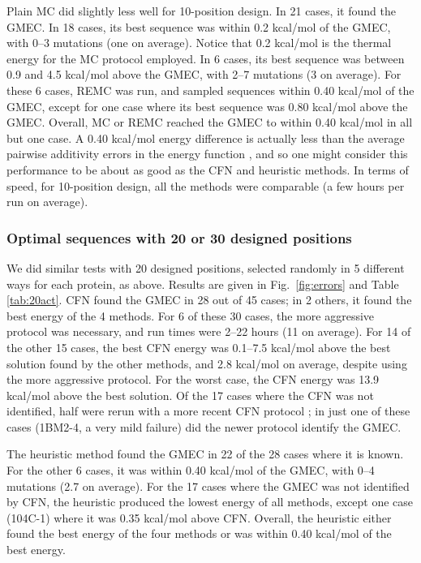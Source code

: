 \documentclass[a4paper,12pt]{article}
\begin{document}
Plain MC did slightly less well for 10-position design. In 21 cases, it found the GMEC. In 18 cases, its best sequence
was within 0.2 kcal/mol of the GMEC, with 0--3 mutations (one on average). Notice that 0.2 kcal/mol is the thermal
energy for the MC protocol employed. In 6 cases, its best sequence was between 0.9 and 4.5 kcal/mol above the GMEC,
with 2--7 mutations (3 on average). For these 6 cases, REMC was run, and sampled sequences within 0.40 kcal/mol of
the GMEC, except for one case where its best sequence was 0.80 kcal/mol above the GMEC. Overall, MC or REMC reached
the GMEC to within 0.40 kcal/mol in all but one case. A 0.40 kcal/mol energy difference is actually less than the
average pairwise additivity errors in the energy function \cite{Lopes07,Schmidt08b,Gaillard14}, and so one might consider
this performance to be about as good as the CFN and heuristic methods. In terms of speed, for 10-position design,
all the methods were comparable (a few hours per run on average).

\subsubsection{Optimal sequences with 20 or 30 designed positions}
We did similar tests with 20 designed positions, selected randomly in 5 different ways for each protein, as above.
Results are given in Fig.\ \ref{fig:errors} and Table \ref{tab:20act}. CFN found the GMEC in 28 out of 45 cases;
in 2 others, it found the best energy of the 4 methods. For 6 of these 30 cases, the more aggressive protocol was
necessary, and run times were 2--22 hours (11 on average). For 14 of the other 15 cases, the best CFN energy was
0.1--7.5 kcal/mol above the best solution found by the other methods, and 2.8 kcal/mol on average, despite using the
more aggressive protocol. For the worst case, the CFN energy was 13.9 kcal/mol above the best solution. Of the 17
cases where the CFN was not identified, half were rerun with a more recent CFN protocol \cite{Simoncini15}; in
just one of these cases (1BM2-4, a very mild failure) did the newer protocol identify the GMEC.

The heuristic method found the GMEC in 22 of the 28 cases where it is known. For the other 6 cases, it was within 0.40
kcal/mol of the GMEC, with 0--4 mutations (2.7 on average). For the 17 cases where the GMEC was not identified by CFN,
the heuristic produced the lowest energy of all methods, except one case (104C-1) where it was 0.35 kcal/mol above CFN.
Overall, the heuristic either found the best energy of the four methods or was within 0.40 kcal/mol of the best energy.
\end{document}
